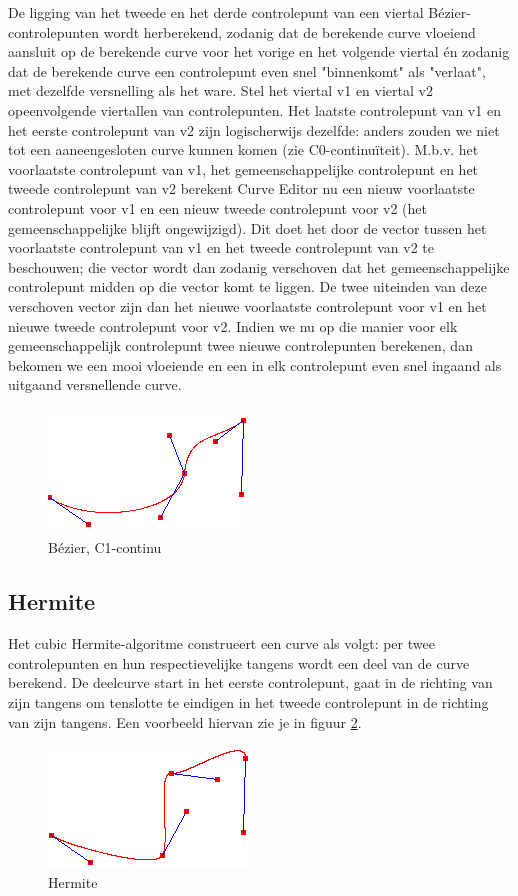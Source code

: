 \documentclass[a4paper,11pt,oneside, titlepage]{article}
\begin{document}
De ligging van het tweede en het derde controlepunt van een viertal B\'ezier-controlepunten wordt herberekend, zodanig dat de berekende curve vloeiend aansluit op de berekende curve voor het vorige en het volgende viertal \'en zodanig dat de berekende curve een controlepunt even snel "binnenkomt" als "verlaat", met dezelfde versnelling als het ware. Stel het viertal v1 en viertal v2 opeenvolgende viertallen van controlepunten. Het laatste controlepunt van v1 en het eerste controlepunt van v2 zijn logischerwijs dezelfde: anders zouden we niet tot een aaneengesloten curve kunnen komen (zie C0-continu\"iteit). M.b.v. het voorlaatste controlepunt van v1, het gemeenschappelijke controlepunt en het tweede controlepunt van v2 berekent Curve Editor nu een nieuw voorlaatste controlepunt voor v1 en een nieuw tweede controlepunt voor v2 (het gemeenschappelijke blijft ongewijzigd). Dit doet het door de vector tussen het voorlaatste controlepunt van v1 en het tweede controlepunt van v2 te beschouwen; die vector wordt dan zodanig verschoven dat het gemeenschappelijke controlepunt midden op die vector komt te liggen. De twee uiteinden van deze verschoven vector zijn dan het nieuwe voorlaatste controlepunt voor v1 en het nieuwe tweede controlepunt voor v2. Indien we nu op die manier voor elk gemeenschappelijk controlepunt twee nieuwe controlepunten berekenen, dan bekomen we een mooi vloeiende en een in elk controlepunt even snel ingaand als uitgaand versnellende curve.
\begin{figure}
\begin{center}
\includegraphics[scale=0.4]{./screenies2/bezierC1.png}
\caption{B\'ezier, C1-continu}\label{bezierC1}
\end{center}
\end{figure}
\subsection{Hermite}
Het cubic Hermite-algoritme construeert een curve als volgt: 
per twee controlepunten en hun respectievelijke tangens wordt een deel van de curve berekend.
De deelcurve start in het eerste controlepunt, gaat in de richting van zijn tangens om
tenslotte te eindigen in het tweede controlepunt in de richting van zijn tangens. Een voorbeeld hiervan zie je in figuur \ref{hermite}.
\begin{figure}[htbp]
\centering
\includegraphics[scale=0.4]{./screenies2/hermite.png}
\caption{Hermite}\label{hermite}
\end{figure}
\end{document}
